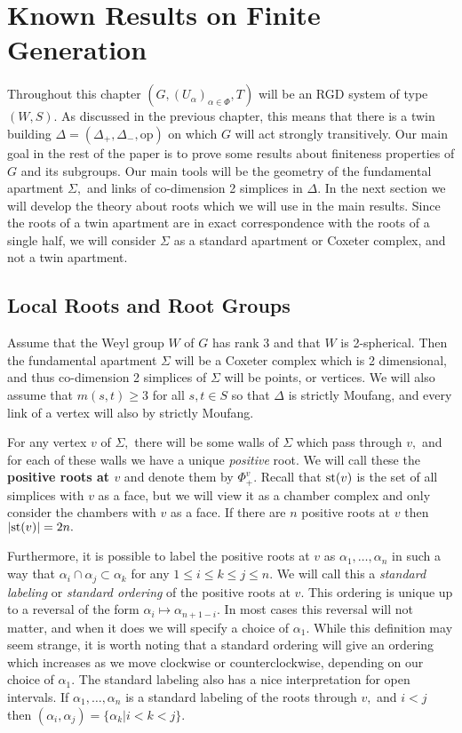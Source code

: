 \documentclass[class=book, crop=false,12 pt]{standalone}
\begin{document}
\chapter{Known Results on Finite Generation}
\label{ch:known}

Throughout this chapter $(G,(U_\alpha)_{\alpha\in \Phi},T)$ will be an RGD system of type $(W,S).$ As discussed in the previous chapter, this means that there is a twin building $\Delta=(\Delta_+,\Delta_-,\mathrm{op})$ on which $G$ will act strongly transitively. Our main goal in the rest of the paper is to prove some results about finiteness properties of $G$ and its subgroups. Our main tools will be the geometry of the fundamental apartment $\Sigma,$ and links of co-dimension 2 simplices in $\Delta.$ In the next section we will develop the theory about roots which we will use in the main results. Since the roots of a twin apartment are in exact correspondence with the roots of a single half, we will consider $\Sigma$ as a standard apartment or Coxeter complex, and not a twin apartment.

\section{Local Roots and Root Groups}
Assume that the Weyl group $W$ of $G$ has rank 3 and that $W$ is 2-spherical. Then the fundamental apartment $\Sigma$ will be a Coxeter complex which is 2 dimensional, and thus co-dimension 2 simplices of $\Sigma$ will be points, or vertices. We will also assume that $m(s,t)\ge 3$ for all $s,t\in S$ so that $\Delta$ is strictly Moufang, and every link of a vertex will also by strictly Moufang.

For any vertex $v$ of $\Sigma,$ there will be some walls of $\Sigma$ which pass through $v,$ and for each of these walls we have a unique \emph{positive} root. We will call these the \textbf{positive roots at $v$} and denote them by $\Phi_+^v.$ Recall that $\mathrm{st}(v)$ is the set of all simplices with $v$ as a face, but we will view it as a chamber complex and only consider the chambers with $v$ as a face. If there are $n$ positive roots at $v$ then $|\mathrm{st}(v)|=2n.$ 

Furthermore, it is possible to label the positive roots at $v$ as $\alpha_1,\dots,\alpha_n$ in such a way that $\alpha_i\cap \alpha_j\subset \alpha_k$ for any $1\le i\le k\le j\le n.$ We will call this a \emph{standard labeling} or \emph{standard ordering} of the positive roots at $v.$ This ordering is unique up to a reversal of the form $\alpha_i\mapsto \alpha_{n+1-i}.$ In most cases this reversal will not matter, and when it does we will specify a choice of $\alpha_1.$ While this definition may seem strange, it is worth noting that a standard ordering will give an ordering which increases as we move clockwise or counterclockwise, depending on our choice of $\alpha_1.$ The standard labeling also has a nice interpretation for open intervals. If $\alpha_1,\dots,\alpha_n$ is a standard labeling of the roots through $v,$ and $i<j$ then $(\alpha_i,\alpha_j)=\{\alpha_k|i<k<j\}.$
\end{document}

